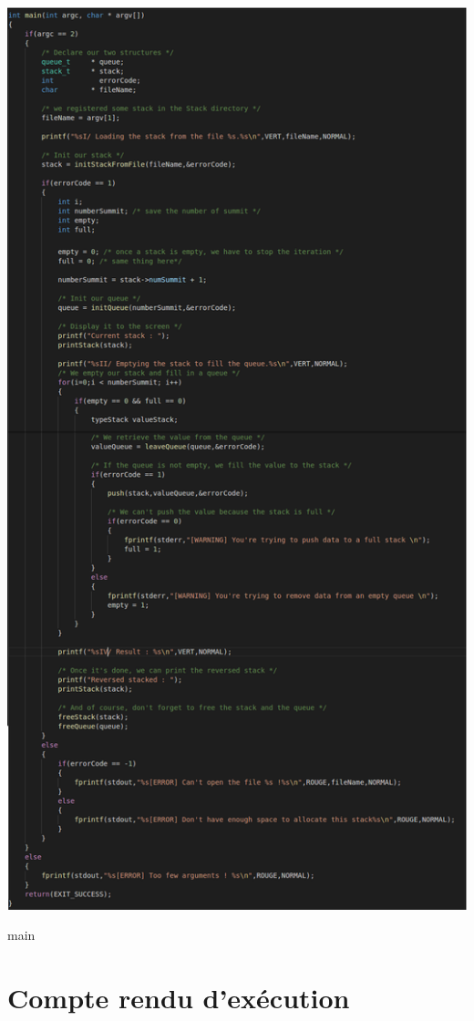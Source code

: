 \documentclass[a4paper]{article}
\begin{document}
\begin{center}
\includegraphics[scale=0.4]{main.png}

main
\end{center}
\section{Compte rendu d'exécution}
\end{document}
